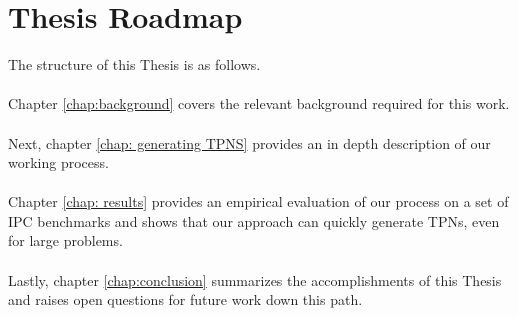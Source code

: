 \section{Thesis Roadmap}
\label{intro: Thesis Roadmap}

The structure of this Thesis is as follows.\\ \\
Chapter \ref{chap:background} covers the relevant background required for this work.\\ \\
Next, chapter \ref{chap: generating TPNS} provides an in depth description of our working process.\\ \\
Chapter \ref{chap: results} provides an empirical evaluation of our process on a set of IPC benchmarks and shows that our approach can quickly generate TPNs, even for large problems.\\ \\
Lastly, chapter \ref{chap:conclusion} summarizes the accomplishments of this Thesis and raises open questions for future work down this path.
